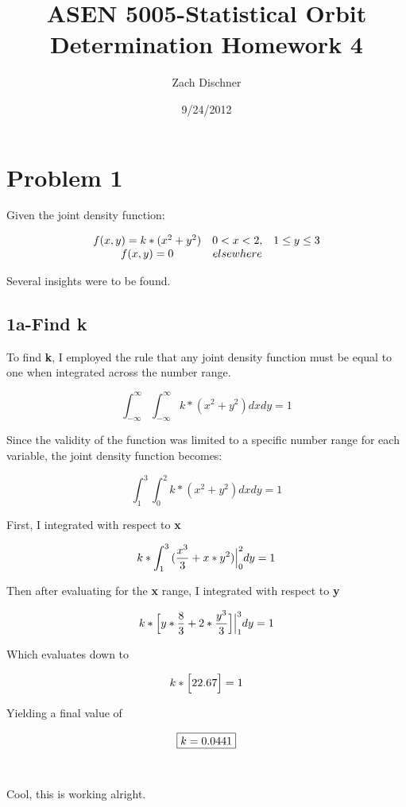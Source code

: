\documentclass[]{article}
\begin{document}
\title{ASEN 5005-Statistical Orbit Determination
Homework 4}
\author{Zach Dischner}
\date{9/24/2012}
\maketitle


\section{Problem 1}
Given the joint density function:

\[\begin{array}[b]{ccc}
f(x,y)=k*(x^2+y^2)   &  0<x<2,&1\le y\le 3 \cr 
 f(x,y) = 0 & elsewhere & 
\end{array}\]

Several insights were to be found.



\subsection{1a-Find k} 
To find {\bf k}, I employed the rule that any joint density function must be equal to one when integrated across the number range. 


\begin{equation} 
 \int_{-\infty}^\infty{\int_{-\infty}^\infty{ k*(x^2 + y^2) } dx dy} = 1 
\end{equation}

\noindent Since the validity of the function was limited to a specific number range for each variable, the joint density function  becomes:

\begin{equation}
\int_1^3{\int_0^2{ k*(x^2 + y^2) } dx dy} = 1 
\end{equation}

\noindent First, I integrated with respect to {\bf x}

\begin{equation}
{k*\int_1^3{(\frac{x^3 }{ 3} + x*y^2) } \Big{|}_0^2 dy} = 1 
\end{equation}

\noindent Then after evaluating for the {\bf x} range, I integrated with respect to  {\bf y}

\begin{equation}
{k*\Big{ [ } y*\frac{8}{3} + 2*\frac{y^3}{3} \Big{ ] }  \Big{|}_1^3 dy} = 1 
\end{equation}

\noindent Which evaluates down to

\begin{equation}
k*\Big{ [ }  22.67 \Big{ ] } = 1 
\end{equation}

\noindent Yielding a final value of 

\begin{equation}
	\boxed {\LARGE k = 0.0441} 
\end{equation}

\

Cool, this is working alright. 
\end{document}
